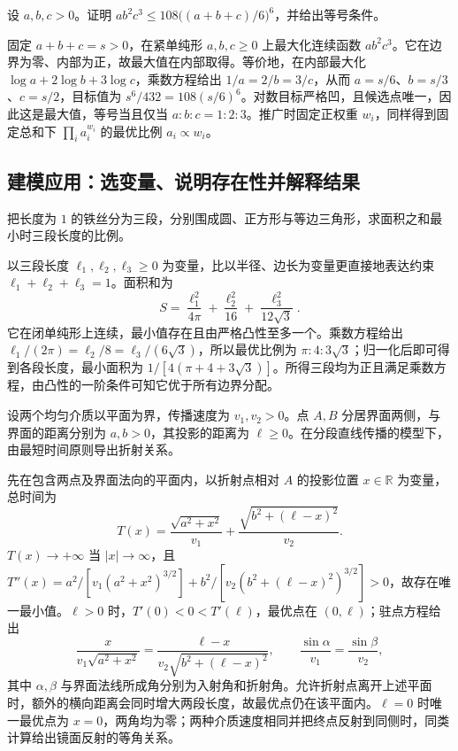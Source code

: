 \begin{example}
\label{ex:pei-weighted-product-bound}
设 $a,b,c>0$。证明 $ab^2c^3\le108\bigl((a+b+c)/6\bigr)^6$，并给出等号条件。
\end{example}
\begin{solve}
固定 $a+b+c=s>0$，在紧单纯形 $a,b,c\ge0$ 上最大化连续函数 $ab^2c^3$。它在边界为零、内部为正，故最大值在内部取得。等价地，在内部最大化 $\log a+2\log b+3\log c$，乘数方程给出 $1/a=2/b=3/c$，从而 $a=s/6$、$b=s/3$、$c=s/2$，目标值为 $s^6/432=108(s/6)^6$。对数目标严格凹，且候选点唯一，因此这是最大值，等号当且仅当 $a:b:c=1:2:3$。推广时固定正权重 $w_i$，同样得到固定总和下 $\prod_i a_i^{w_i}$ 的最优比例 $a_i\propto w_i$。
\end{solve}

\subsection{建模应用：选变量、说明存在性并解释结果}

\begin{example}
把长度为 $1$ 的铁丝分为三段，分别围成圆、正方形与等边三角形，求面积之和最小时三段长度的比例。
\end{example}
\begin{solve}
以三段长度 $\ell_1,\ell_2,\ell_3\ge0$ 为变量，比以半径、边长为变量更直接地表达约束 $\ell_1+\ell_2+\ell_3=1$。面积和为
\[
S=\frac{\ell_1^2}{4\pi}+\frac{\ell_2^2}{16}+\frac{\ell_3^2}{12\sqrt3}.
\]
它在闭单纯形上连续，最小值存在且由严格凸性至多一个。乘数方程给出 $\ell_1/(2\pi)=\ell_2/8=\ell_3/(6\sqrt3)$，所以最优比例为 $\pi:4:3\sqrt3$；归一化后即可得到各段长度，最小面积为 $1/[4(\pi+4+3\sqrt3)]$。所得三段均为正且满足乘数方程，由凸性的一阶条件可知它优于所有边界分配。
\end{solve}

\begin{example}
设两个均匀介质以平面为界，传播速度为 $v_1,v_2>0$。点 $A,B$ 分居界面两侧，与界面的距离分别为 $a,b>0$，其投影的距离为 $\ell\ge0$。在分段直线传播的模型下，由最短时间原则导出折射关系。
\end{example}
\begin{solve}
先在包含两点及界面法向的平面内，以折射点相对 $A$ 的投影位置 $x\in\mathbb R$ 为变量，总时间为
\[
T(x)=\frac{\sqrt{a^2+x^2}}{v_1}+\frac{\sqrt{b^2+(\ell-x)^2}}{v_2}.
\]
$T(x)\to+\infty$ 当 $|x|\to\infty$，且 $T''(x)=a^2/[v_1(a^2+x^2)^{3/2}]+b^2/[v_2(b^2+(\ell-x)^2)^{3/2}]>0$，故存在唯一最小值。$\ell>0$ 时，$T'(0)<0<T'(\ell)$，最优点在 $(0,\ell)$；驻点方程给出
\[
\frac{x}{v_1\sqrt{a^2+x^2}}=\frac{\ell-x}{v_2\sqrt{b^2+(\ell-x)^2}},\qquad\frac{\sin\alpha}{v_1}=\frac{\sin\beta}{v_2},
\]
其中 $\alpha,\beta$ 与界面法线所成角分别为入射角和折射角。允许折射点离开上述平面时，额外的横向距离会同时增大两段长度，故最优点仍在该平面内。$\ell=0$ 时唯一最优点为 $x=0$，两角均为零；两种介质速度相同并把终点反射到同侧时，同类计算给出镜面反射的等角关系。
\end{solve}

